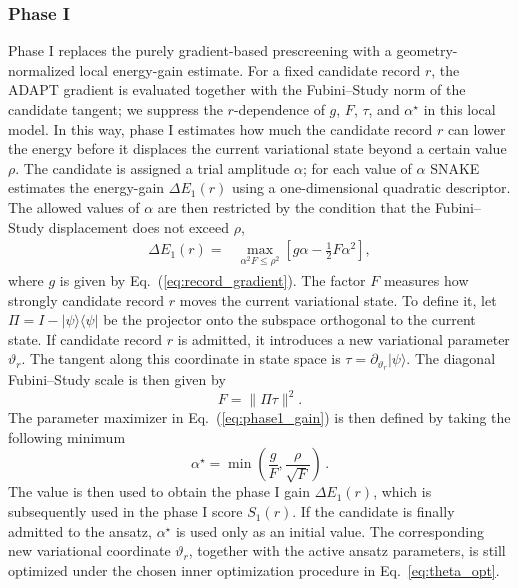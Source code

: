 \documentclass[
  reprint,
  amsmath,
  amssymb,
  aps,
  pra,
  nofootinbib,
  superscriptaddress,
  floatfix
]{revtex4-2}
\newcommand{\ket}[1]{|#1\rangle}
\newcommand{\bra}[1]{\langle #1|}
\begin{document}
\subsubsection{Phase I}
%
\noindent
Phase I replaces the purely gradient-based prescreening with a geometry-normalized local energy-gain estimate. For a fixed candidate record \(r\), the ADAPT gradient is evaluated together with the Fubini--Study norm of the candidate tangent\cite{Nocedal2006TrustRegion}; we suppress the \(r\)-dependence of \(g\), \(F\), \(\tau\), and \(\alpha^\star\) in this local model. In this way, phase I estimates how much the candidate record \(r\) can lower the energy before it displaces the current variational state beyond a certain value \(\rho\). The candidate is assigned a trial amplitude \(\alpha\); for each value of \(\alpha\) \textsc{SNAKE} estimates the energy-gain \(\Delta E_{1}(r)\) using a one-dimensional quadratic descriptor. The allowed values of \(\alpha\) are then restricted by the condition that the Fubini--Study displacement does not exceed \(\rho\),
%
\begin{equation}
\begin{split}
\Delta E_{1}(r)={}&\max_{\alpha^2F\le \rho^2} \left[g\alpha-\frac{1}{2}F\alpha^2\right],
\end{split}
\label{eq:phase1_gain}
\end{equation}
%
where \(g\) is given by Eq.~(\ref{eq:record_gradient}). The factor \(F\) measures how strongly candidate record \(r\) moves the current variational state. To define it, let \(\Pi=I-\ket{\psi}\bra{\psi}\) be the projector onto the subspace orthogonal to the current state. If candidate record \(r\) is admitted, it introduces a new variational parameter \(\vartheta_r\). The tangent along this coordinate in state space is \(\tau=\partial_{\vartheta_r}\ket{\psi}\). The diagonal Fubini--Study scale is then given by
%
\begin{equation}
F=\|\Pi\tau\|^2.
\label{eq:phase1_tangent_scale}
\end{equation}
%
The parameter maximizer in Eq.~(\ref{eq:phase1_gain}) is then defined by taking the following minimum
\begin{equation}
\alpha^\star
=
\min\!\left(
\dfrac{g}{F},
\dfrac{\rho}{\sqrt{F}}
\right)\,.
\label{eq:phase1_alpha_star}
\end{equation}
The value is then used to obtain the phase I gain \(\Delta E_1(r)\), which is subsequently used in the phase I score \(S_1(r)\). If the candidate is finally admitted to the ansatz, \(\alpha^\star\) is used only as an initial value. The corresponding new variational coordinate \(\vartheta_r\), together with the active ansatz parameters, is still optimized under the chosen inner optimization procedure in Eq.~\ref{eq:theta_opt}.
\end{document}

